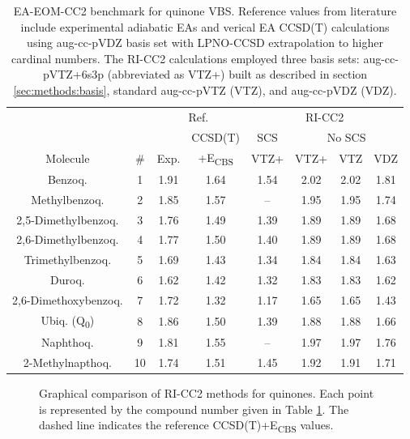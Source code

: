 \begin{table}[h!]
  \centering
  \caption[EA-EOM-CC2 benchmark for quinone VBS.]{EA-EOM-CC2 benchmark for quinone VBS. Reference values from literature\cite{schulz2018systematic} include experimental adiabatic EAs and verical EA CCSD(T) calculations using aug-cc-pVDZ basis set with LPNO-CCSD extrapolation to higher cardinal numbers. The RI-CC2 calculations employed three basis sets: aug-cc-pVTZ+6s3p (abbreviated as VTZ+) built as described in section \ref{sec:methods:basis}, standard aug-cc-pVTZ (VTZ), and aug-cc-pVDZ (VDZ).}
  \label{tab:Quinones}
  \centering
  \begin{tabular}{cccccccc}
  \toprule
   & & \multicolumn{2}{c}{Ref. \cite{schulz2018systematic}} & \multicolumn{4}{c}{RI-CC2}  \\
   \cmidrule(lr){3-4} \cmidrule(lr){5-8}
   & & & CCSD(T) & SCS & \multicolumn{3}{c}{No SCS} \\
  \cmidrule(lr){6-8}
  Molecule & \# & Exp. & +E\textsubscript{CBS} & VTZ+ & VTZ+ & VTZ & VDZ  \\
  \midrule
  Benzoq. & 1  & 1.91 & 1.64 & 1.54 & 2.02 & 2.02 & 1.81 \\
  Methylbenzoq. & 2  & 1.85 & 1.57 &  --  & 1.95 & 1.95 & 1.74 \\
  2,5-Dimethylbenzoq. & 3  & 1.76 & 1.49 & 1.39 & 1.89 & 1.89 & 1.68 \\
  2,6-Dimethylbenzoq. & 4  & 1.77 & 1.50 & 1.40 & 1.89 & 1.89 & 1.68 \\
  Trimethylbenzoq. & 5  & 1.69 & 1.43 & 1.34 & 1.84 & 1.84 & 1.63 \\
  Duroq. & 6  & 1.62 & 1.42 & 1.32 & 1.83 & 1.83 & 1.62 \\
  2,6-Dimethoxybenzoq. & 7  & 1.72 & 1.32 & 1.17 & 1.65 & 1.65 & 1.43 \\
  Ubiq. (Q\textsubscript{0}) & 8  & 1.86 & 1.50 & 1.39 & 1.88 & 1.88 & 1.66 \\
  Naphthoq. & 9  & 1.81 & 1.55 &  --  & 1.97 & 1.97 & 1.76 \\
  2-Methylnapthoq. & 10 & 1.74 & 1.51 & 1.45 & 1.92 & 1.91 & 1.71 \\
  \bottomrule
  \end{tabular}
\end{table}


\begin{figure}[h!]
  \centering
  \small
  
  \caption{Graphical comparison of RI-CC2 methods for quinones. Each point is represented by the compound number given in Table \ref{tab:Quinones}. The dashed line indicates the reference CCSD(T)+E\textsubscript{CBS} values.}
  \label{fig:Quinones}
\end{figure}
  
